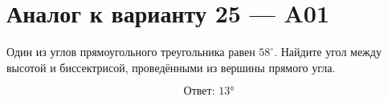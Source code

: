 


\section*{Аналог к варианту 25 — A01}
Один из углов прямоугольного треугольника равен \(58^\circ\). Найдите угол между высотой и биссектрисой, проведёнными из вершины прямого угла.
\begin{center}\figRightAltitudeBisector\end{center}
\[\boxed{\text{Ответ: }13°}\]


